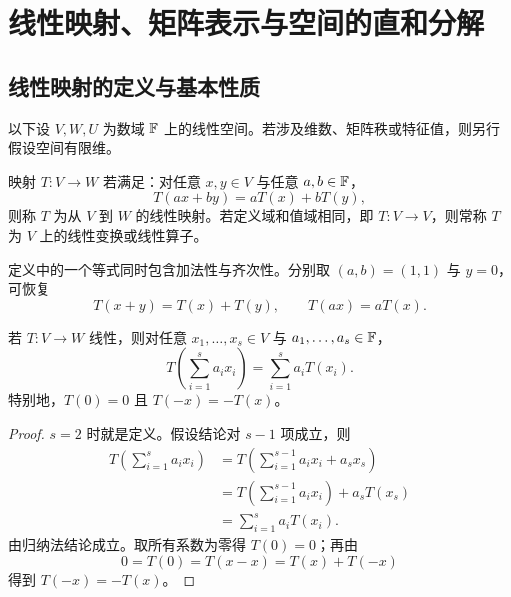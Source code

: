 %
%

\chapter{线性映射、矩阵表示与空间的直和分解}

\section{线性映射的定义与基本性质}

以下设 $V,W,U$ 为数域 $\mathbb{F}$ 上的线性空间。若涉及维数、矩阵秩或特征值，则另行假设空间有限维。

\begin{definition}[线性映射与线性变换]
映射 $T:V\to W$ 若满足：对任意 $x,y\in V$ 与任意 $a,b\in\mathbb{F}$，
\[
T(ax+by)=aT(x)+bT(y),
\]
则称 $T$ 为从 $V$ 到 $W$ 的线性映射。若定义域和值域相同，即 $T:V\to V$，则常称 $T$ 为 $V$ 上的线性变换或线性算子。
\end{definition}

定义中的一个等式同时包含加法性与齐次性。分别取 $(a,b)=(1,1)$ 与 $y=0$，可恢复
\[
T(x+y)=T(x)+T(y),\qquad T(ax)=aT(x).
\]

\begin{proposition}[有限线性组合的保持性]
若 $T:V\to W$ 线性，则对任意 $x_1,\ldots,x_s\in V$ 与 $a_1,\ldots,a_s\in\mathbb{F}$，
\[
T\left(\sum_{i=1}^s a_ix_i\right)
=\sum_{i=1}^s a_iT(x_i).
\]
特别地，$T(0)=0$ 且 $T(-x)=-T(x)$。
\end{proposition}
\begin{proof}
$s=2$ 时就是定义。假设结论对 $s-1$ 项成立，则
\begin{align*}
T\left(\sum_{i=1}^s a_ix_i\right)
&=T\left(\sum_{i=1}^{s-1}a_ix_i+a_sx_s\right)\\
&=T\left(\sum_{i=1}^{s-1}a_ix_i\right)+a_sT(x_s)\\
&=\sum_{i=1}^s a_iT(x_i).
\end{align*}
由归纳法结论成立。取所有系数为零得 $T(0)=0$；再由
\[
0=T(0)=T(x-x)=T(x)+T(-x)
\]
得到 $T(-x)=-T(x)$。
\end{proof}

